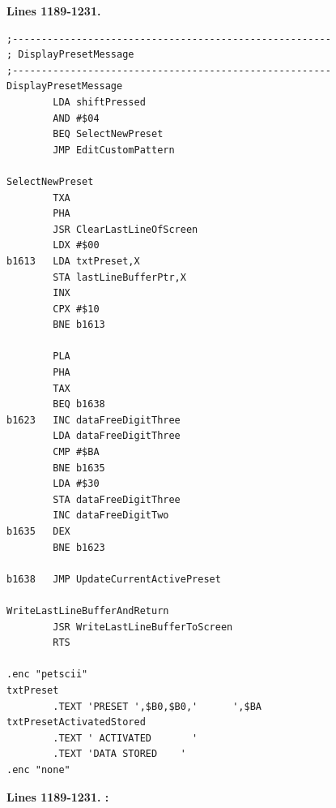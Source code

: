 \clearpage
\textbf{Lines 1189-1231. } 
\begin{lstlisting}
;-------------------------------------------------------
; DisplayPresetMessage
;-------------------------------------------------------
DisplayPresetMessage    
        LDA shiftPressed
        AND #$04
        BEQ SelectNewPreset
        JMP EditCustomPattern

SelectNewPreset
        TXA 
        PHA 
        JSR ClearLastLineOfScreen
        LDX #$00
b1613   LDA txtPreset,X
        STA lastLineBufferPtr,X
        INX 
        CPX #$10
        BNE b1613

        PLA 
        PHA 
        TAX 
        BEQ b1638
b1623   INC dataFreeDigitThree
        LDA dataFreeDigitThree
        CMP #$BA
        BNE b1635
        LDA #$30
        STA dataFreeDigitThree
        INC dataFreeDigitTwo
b1635   DEX 
        BNE b1623

b1638   JMP UpdateCurrentActivePreset

WriteLastLineBufferAndReturn    
        JSR WriteLastLineBufferToScreen
        RTS 

.enc "petscii" 
txtPreset
        .TEXT 'PRESET ',$B0,$B0,'      ',$BA
txtPresetActivatedStored
        .TEXT ' ACTIVATED       '
        .TEXT 'DATA STORED    '
.enc "none" 
\end{lstlisting}
\clearpage

\textbf{Lines 1189-1231. :} 
\clearpage

